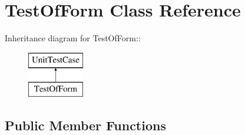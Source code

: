 \hypertarget{class_test_of_form}{
\section{TestOfForm Class Reference}
\label{class_test_of_form}
}
Inheritance diagram for TestOfForm::\begin{figure}[H]
\begin{center}
\leavevmode
\includegraphics[height=2cm]{class_test_of_form}
\end{center}
\end{figure}
\subsection*{Public Member Functions}
